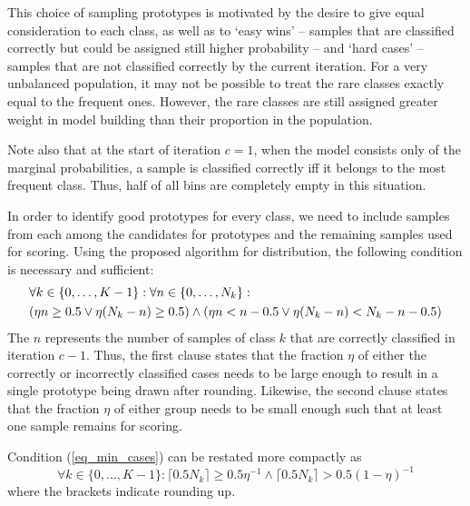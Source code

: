 %
\begin{remark}
This choice of sampling prototypes is motivated by the desire to give equal consideration to each class, as well as to `easy wins' -- samples that are classified correctly but could be assigned still higher probability -- and `hard cases' -- samples that are not classified correctly by the current iteration.
For a very unbalanced population, it may not be possible to treat the rare classes exactly equal to the frequent ones.
However, the rare classes are still assigned greater weight in model building than their proportion in the population.\par
%
Note also that at the start of iteration $c=1$, when the model consists only of the marginal probabilities, a sample is classified correctly iff it belongs to the most frequent class.
Thus, half of all bins are completely empty in this situation.
\end{remark}
%
In order to identify good prototypes for every class, we need to include samples from each among the candidates for prototypes and the remaining samples used for scoring. Using the proposed algorithm for distribution, the following condition is necessary and sufficient:
%
\begin{align}
&\forall k\in\{0,\dots,K-1\}:\forall n\in\{0,\dots,N_k\}:\label{eq_min_cases}\\
&(\eta n\geq0.5\vee\eta(N_k-n)\geq0.5)\wedge(\eta n<n-0.5\vee\eta(N_k-n)<N_k-n-0.5)\notag
\end{align}
%
The $n$ represents the number of samples of class $k$ that are correctly classified in iteration $c-1$.
Thus, the first clause states that the fraction $\eta$ of either the correctly or incorrectly classified cases needs to be large enough to result in a single prototype being drawn after rounding.
Likewise, the second clause states that the fraction $\eta$ of either group needs to be small enough such that at least one sample remains for scoring.\par
%
\begin{lemma}
Condition (\ref{eq_min_cases}) can be restated more compactly as
%
\begin{equation}
\forall k\in\{0,\dots,K-1\}:\lceil0.5N_k\rceil\geq0.5\eta^{-1}\wedge\lceil0.5N_k\rceil>0.5(1-\eta)^{-1}\label{eq_min_cases_2}
\end{equation}
%
where the brackets indicate rounding up.
\end{lemma}
%
